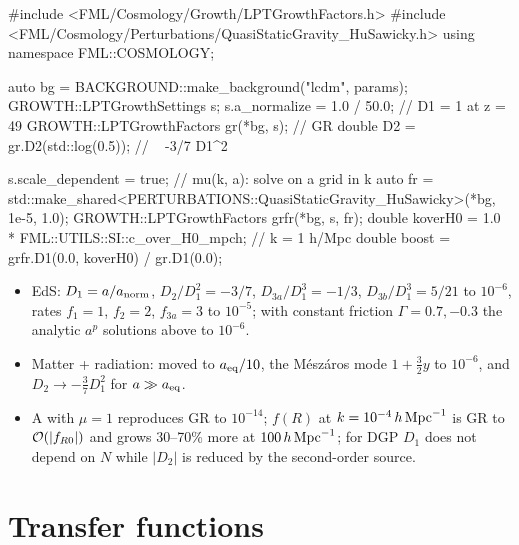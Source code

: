 \begin{cppcode}
#include <FML/Cosmology/Growth/LPTGrowthFactors.h>
#include <FML/Cosmology/Perturbations/QuasiStaticGravity_HuSawicky.h>
using namespace FML::COSMOLOGY;

auto bg = BACKGROUND::make_background("lcdm", params);
GROWTH::LPTGrowthSettings s;
s.a_normalize = 1.0 / 50.0;                         // D1 = 1 at z = 49
GROWTH::LPTGrowthFactors gr(*bg, s);                // GR
double D2 = gr.D2(std::log(0.5));                   // ~ -3/7 D1^2

s.scale_dependent = true;                           // mu(k, a): solve on a grid in k
auto fr = std::make_shared<PERTURBATIONS::QuasiStaticGravity_HuSawicky>(*bg, 1e-5, 1.0);
GROWTH::LPTGrowthFactors grfr(*bg, s, fr);
double koverH0 = 1.0 * FML::UTILS::SI::c_over_H0_mpch;   // k = 1 h/Mpc
double boost = grfr.D1(0.0, koverH0) / gr.D1(0.0);
\end{cppcode}

\begin{validation}
\begin{itemize}
\item EdS: $D_1=a/a_{\rm norm}$, $D_2/D_1^2=-3/7$, $D_{3a}/D_1^3=-1/3$, $D_{3b}/D_1^3=5/21$ to $10^{-6}$, rates
      $f_1=1$, $f_2=2$, $f_{3a}=3$ to $10^{-5}$; with constant friction $\Gamma=0.7,-0.3$ the analytic $a^p$ solutions
      above to $10^{-6}$.
\item Matter + radiation:  moved to $a_{\rm eq}/10$, the M\'esz\'aros mode $1+\frac32y$ to $10^{-6}$, and
      $D_2\to-\frac37D_1^2$ for $a\gg a_{\rm eq}$.
\item A  with $\mu=1$ reproduces GR to $10^{-14}$; $f(R)$ at $k=10^{-4}\,h\,\mathrm{Mpc}^{-1}$ is GR to
      $\mathcal{O}(|f_{R0}|)$ and grows 30--70\% more at $100\,h\,\mathrm{Mpc}^{-1}$; for DGP $D_1$ does not depend on $N$ while $|D_2|$ is
      reduced by the second-order source.
\end{itemize}
\end{validation}

\section{Transfer functions}\label{sec:transfer}

